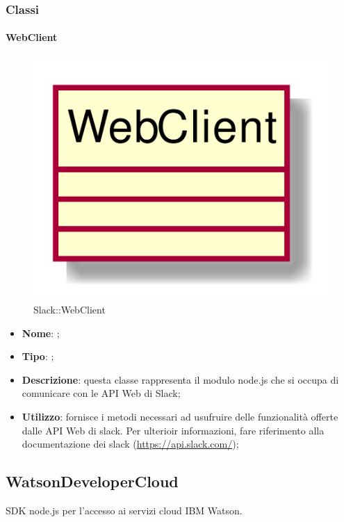 \subsubsection{Classi}
\hypertarget{WebClient_label}{\paragraph{WebClient}}
\begin{figure}[h]
	\centering
	\includegraphics[width=\textwidth,height=\textheight,keepaspectratio]{images/ClassWebClient.png}
	\caption{Slack::WebClient}
\end{figure}
\begin{itemize}
	\item \textbf{Nome}: ;
	\item \textbf{Tipo}: ;
	\item \textbf{Descrizione}: questa classe rappresenta il modulo node.js che si occupa di comunicare con le API Web di Slack;
	\item \textbf{Utilizzo}: fornisce i metodi necessari ad usufruire delle funzionalità offerte dalle API Web di slack. Per ulterioir informazioni, fare riferimento alla documentazione dei slack (\url{https://api.slack.com/});
\end{itemize}
\FloatBarrier

\subsection{WatsonDeveloperCloud}
SDK node.js per l'accesso ai servizi cloud IBM Watson.
